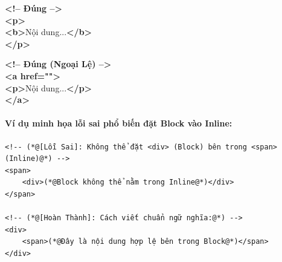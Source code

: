 \begin{center}
\begin{tcolorbox}
\vspace{10pt}\noindent
\begin{minipage}[t]{0.485\linewidth}
    \begin{tcolorbox}[
        enhanced,
        colback=darkText!92!black,
        colframe=green!60!black,
        arc=5pt,
        boxrule=1pt,
        top=6pt, bottom=6pt, left=8pt, right=8pt
    ]
        {\small\ttfamily\bfseries\color{green!40} <!-- Đúng -->}\\[3pt]
        {\small\ttfamily\color{white!95}
        \textcolor{codeKey}{\textbf{<p>}}\\
        \hspace*{1.2em}\textcolor{codeKey}{\textbf{<b>}}Nội dung...\textcolor{codeKey}{\textbf{</b>}}\\
        \textcolor{codeKey}{\textbf{</p>}}}
    \end{tcolorbox}
    \vspace{3pt}
\end{minipage}\hfill
\begin{minipage}[t]{0.485\linewidth}
    \begin{tcolorbox}[
        enhanced,
        colback=darkText!92!black,
        colframe=accentOrange,
        arc=5pt,
        boxrule=1pt,
        top=6pt, bottom=6pt, left=8pt, right=8pt
    ]
        {\small\ttfamily\bfseries\color{accentOrange!80!white} <!-- Đúng (Ngoại Lệ) -->}\\[3pt]
        {\small\ttfamily\color{white!95}
        \textcolor{codeKey}{\textbf{<a href="">}}\\
        \hspace*{1.2em}\textcolor{codeKey}{\textbf{<p>}}Nội dung...\textcolor{codeKey}{\textbf{</p>}}\\
        \textcolor{codeKey}{\textbf{</a>}}}
    \end{tcolorbox}
    \vspace{3pt}
\end{minipage}
\end{tcolorbox}
\end{center}

\paragraph{Ví dụ minh họa lỗi sai phổ biến đặt Block vào Inline:}
\begin{codeWindow}
\begin{lstlisting}[language=HTML5]
<!-- (*@[Lỗi Sai]: Không thể đặt <div> (Block) bên trong <span> (Inline)@*) -->
<span>
    <div>(*@Block không thể nằm trong Inline@*)</div>
</span>

<!-- (*@[Hoàn Thành]: Cách viết chuẩn ngữ nghĩa:@*) -->
<div>
    <span>(*@Đây là nội dung hợp lệ bên trong Block@*)</span>
</div>
\end{lstlisting}
\end{codeWindow}

